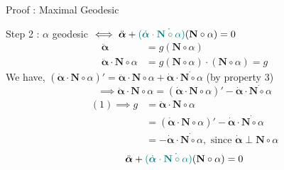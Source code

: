 \documentclass{beamer}
\begin{document}
\begin{frame}{Proof : Maximal Geodesic}
	\begin{block}{Step 2 : $\alpha$ geodesic $\iff \ddot{\boldsymbol{\alpha}} + { \color{teal}(\dot{\boldsymbol{\alpha}} \cdot \dot{\mathbf{N} \circ \alpha})}(\mathbf{N} \circ \alpha) = 0$}
\begin{align*}
	\ddot{\boldsymbol{\alpha}} & = g(\mathbf{N} \circ \alpha) \\
	\ddot{\boldsymbol{\alpha}} \cdot \mathbf{N}\circ \alpha & = g(\mathbf{N} \circ \alpha) \cdot (\mathbf{N} \circ \alpha) = g
\end{align*}
		We have, $(\dot{\boldsymbol{\alpha}} \cdot \mathbf{N}\circ \alpha)' = \ddot{\boldsymbol{\alpha}} \cdot \mathbf{N} \circ \alpha + \dot{\boldsymbol{\alpha}} \cdot \dot{\mathbf{N} \circ \alpha}$ (by property 3)\\
	\begin{equation}
		\implies \ddot{\boldsymbol{\alpha}} \cdot \mathbf{N} \circ \alpha = (\dot{\boldsymbol{\alpha}} \cdot \mathbf{N} \circ \alpha)' - \dot{\boldsymbol{\alpha}} \cdot \dot{\mathbf{N} \circ \alpha}
	\end{equation}
	\begin{align*}
		(1) \implies g & = \ddot{\boldsymbol{\alpha}} \cdot \mathbf{N} \circ \alpha \\
		& = (\dot{\boldsymbol{\alpha}} \cdot \mathbf{N} \circ \alpha)' - \dot{\boldsymbol{\alpha}} \cdot \dot{\mathbf{N} \circ \alpha}\\
		& = - \dot{\boldsymbol{\alpha}} \cdot \dot{\mathbf{N} \circ \alpha}, \text{ since } \dot{\boldsymbol{\alpha}} \perp \mathbf{N}\circ \alpha
	\end{align*}
	\begin{equation}
		\ddot{\boldsymbol{\alpha}} + { \color{teal}(\dot{\boldsymbol{\alpha}} \cdot \dot{\mathbf{N} \circ \alpha})}(\mathbf{N} \circ \alpha) = 0
	\end{equation}
\end{block}
\end{frame}
\end{document}
